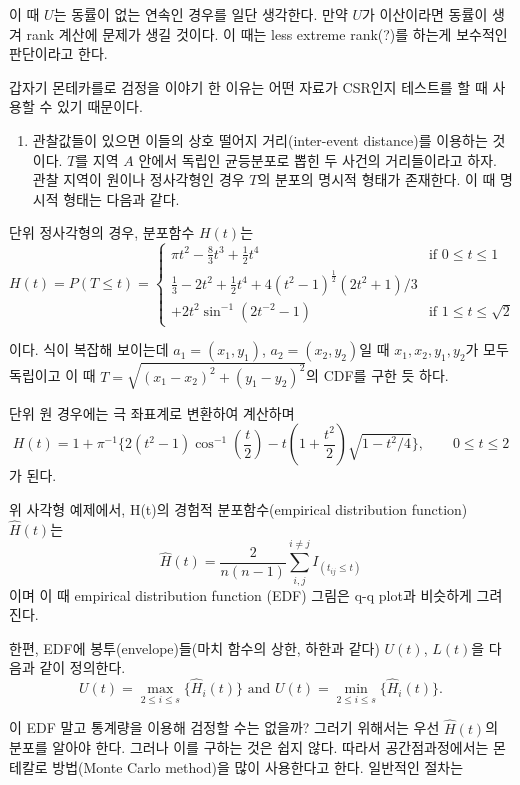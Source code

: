 \documentclass[b5paper,]{scrbook}
\providecommand{\tightlist}{%
  \setlength{\itemsep}{0pt}\setlength{\parskip}{0pt}}
\theoremstyle{plain}
\theoremstyle{definition}
\numberwithin{equation}{section}
\begin{document}
이 때 \(U\)는 동률이 없는 연속인 경우를 일단 생각한다. 만약 \(U\)가
이산이라면 동률이 생겨 rank 계산에 문제가 생길 것이다. 이 때는 less
extreme rank(?)를 하는게 보수적인 판단이라고 한다.

갑자기 몬테카를로 검정을 이야기 한 이유는 어떤 자료가 CSR인지 테스트를
할 때 사용할 수 있기 때문이다.

\begin{enumerate}
\def\labelenumi{\arabic{enumi}.}
\tightlist
\item
  관찰값들이 있으면 이들의 상호 떨어지 거리(inter-event distance)를
  이용하는 것이다. \(T\)를 지역 \(A\) 안에서 독립인 균등분포로 뽑힌 두
  사건의 거리들이라고 하자. 관찰 지역이 원이나 정사각형인 경우 \(T\)의
  분포의 명시적 형태가 존재한다. 이 때 명시적 형태는 다음과 같다.
\end{enumerate}

단위 정사각형의 경우, 분포함수 \(H(t)\)는 \[
H(t)=P(T\leq t) =
\begin{cases}
\pi t^{2}-\frac{8}{3}t^{3}+\frac{1}{2}t^{4} & \text{if $0 \leq t \leq 1$}\\
\frac{1}{3} -2t^{2} + \frac{1}{2}t^{4} + 4(t^{2}-1)^{\frac{1}{2}}(2t^{2}+1)/3\\
+ 2t^{2}\sin^{-1}(2t^{-2}-1) & \text{if $1\leq t \leq \sqrt{2}$}
\end{cases}
\]

이다. 식이 복잡해 보이는데 \(a_{1}=(x_{1},y_{1})\),
\(a_{2}=(x_{2},y_{2})\)일 때 \(x_{1}, x_{2}, y_{1}, y_{2}\)가 모두
독립이고 이 때 \(T=\sqrt{(x_{1}-x_{2})^{2}+(y_{1}-y_{2})^{2}}\)의 CDF를
구한 듯 하다.

단위 원 경우에는 극 좌표계로 변환하여 계산하며
\[H(t)=1+\pi^{-1}\{2(t^{2}-1)\cos^{-1}(\frac{t}{2})-t(1+\frac{t^{2}}{2})\sqrt{1-t^{2}/4}\}, \qquad{0\leq t \leq 2}\]
가 된다.

위 사각형 예제에서, H(t)의 경험적 분포함수(empirical distribution
function) \(\hat{H}(t)\)는
\[\hat{H}(t)=\frac{2}{n(n-1)}\sum_{i,j}^{i\neq j}I_{(t_{ij}\leq t)}\]
이며 이 때 empirical distribution function (EDF) 그림은 q-q plot과
비슷하게 그려진다.

한편, EDF에 봉투(envelope)들(마치 함수의 상한, 하한과 같다) \(U(t)\),
\(L(t)\)을 다음과 같이 정의한다.
\[U(t)=\max_{2\leq i \leq s}\{\hat{H}_{i}(t)\} \text{ and } U(t)=\min_{2\leq i \leq s}\{\hat{H}_{i}(t)\}.\]

이 EDF 말고 통계량을 이용해 검정할 수는 없을까? 그러기 위해서는 우선
\(\hat{H}(t)\)의 분포를 알아야 한다. 그러나 이를 구하는 것은 쉽지 않다.
따라서 공간점과정에서는 몬테칼로 방법(Monte Carlo method)을 많이
사용한다고 한다. 일반적인 절차는
\end{document}
